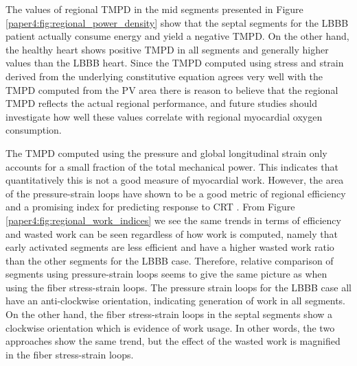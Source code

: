 The values of regional TMPD in the mid segments presented
in Figure \ref{paper4:fig:regional_power_density} show that the septal
segments for the LBBB patient actually consume energy and yield a
negative TMPD. On the other hand, the healthy heart shows positive TMPD
in all segments and generally higher values than the LBBB heart.
Since the TMPD computed using stress and strain derived from the
underlying constitutive equation agrees very well with the TMPD
computed from the PV area there is reason to believe that the regional
TMPD reflects the actual regional performance, and future studies should
investigate how well these values correlate with regional myocardial
oxygen consumption. 

The TMPD computed using the pressure and global longitudinal strain
only accounts for a small fraction of the total mechanical power.
This indicates that quantitatively this is not a good measure of
myocardial work. However, the area of the pressure-strain loops have shown to be a good metric
of regional efficiency and a promising index for predicting response
to CRT \cite{vecera2016wasted}. From Figure
\ref{paper4:fig:regional_work_indices} we see the same trends in terms of efficiency and wasted
work can be seen regardless of how work is computed, namely that early
activated segments are less efficient and have a higher wasted work
ratio than the other segments for the LBBB case. Therefore, relative
comparison of segments using pressure-strain loops seems to give the
same picture as when using the fiber stress-strain loops. 
The pressure strain loops for the LBBB case all have an
anti-clockwise orientation, indicating generation of work in all
segments. On the other hand, the fiber stress-strain loops in the
septal segments show a clockwise orientation which is evidence of
work usage. In other words, the two approaches show the same
trend, but the effect of the wasted work is magnified in the fiber
stress-strain loops.  



